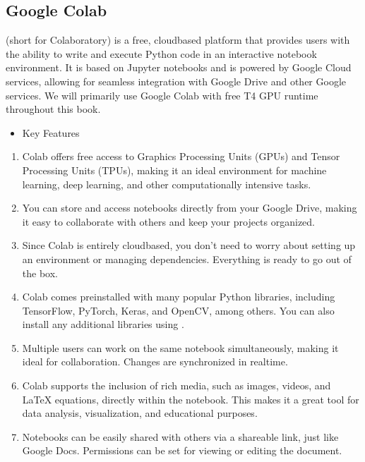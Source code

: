\documentclass[letterpaper,11pt,english]{sphinxmanual}
\begin{document}
\subsection{Google Colab}
\label{\detokenize{prelim:google-colab}}
\sphinxAtStartPar
{} (short for Colaboratory) is a free, cloud\sphinxhyphen{}based platform that provides users with the ability to write
and execute Python code in an interactive notebook environment. It is based on Jupyter notebooks and is powered by
Google Cloud services, allowing for seamless integration with Google Drive and other Google services. We will primarily
use Google Colab with free T4 GPU runtime throughout this book.
\begin{itemize}
\item {} 
\sphinxAtStartPar
Key Features

\end{itemize}
\begin{enumerate}
%
\item {} 
\sphinxAtStartPar
{}
Colab offers free access to Graphics Processing Units (GPUs) and Tensor Processing Units (TPUs), making it an ideal environment for machine learning, deep learning, and other computationally intensive tasks.

\item {} 
\sphinxAtStartPar
{}
You can store and access notebooks directly from your Google Drive, making it easy to collaborate with others and keep your projects organized.

\item {} 
\sphinxAtStartPar
{}
Since Colab is entirely cloud\sphinxhyphen{}based, you don’t need to worry about setting up an environment or managing dependencies. Everything is ready to go out of the box.

\item {} 
\sphinxAtStartPar
{}
Colab comes pre\sphinxhyphen{}installed with many popular Python libraries, including TensorFlow, PyTorch, Keras, and OpenCV, among others. You can also install any additional libraries using .

\item {} 
\sphinxAtStartPar
{}
Multiple users can work on the same notebook simultaneously, making it ideal for collaboration. Changes are synchronized in real\sphinxhyphen{}time.

\item {} 
\sphinxAtStartPar
{}
Colab supports the inclusion of rich media, such as images, videos, and LaTeX equations, directly within the notebook. This makes it a great tool for data analysis, visualization, and educational purposes.

\item {} 
\sphinxAtStartPar
{}
Notebooks can be easily shared with others via a shareable link, just like Google Docs. Permissions can be set for viewing or editing the document.

\end{enumerate}
\end{document}

